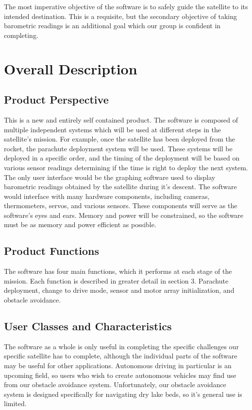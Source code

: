 \documentclass{scrreprt}
\begin{document}
The most imperative objective of the software is to safely guide the satellite to its intended destination. This is a requisite, but the secondary objective of taking barometric readings is an additional goal which our group is confident in completing.

\chapter{Overall Description}

\section{Product Perspective}
This is a new and entirely self contained product. The software is composed of multiple independent systems which will be used at different steps in the satellite's mission. For example, once the satellite has been deployed from the rocket, the parachute deployment system will be used. These systems will be deployed in a specific order, and the timing of the deployment will be based on various sensor readings determining if the time is right to deploy the next system. The only user interface would be the graphing software used to display barometric readings obtained by the satellite during it's descent. The software would interface with many hardware components, including cameras, thermometers, servos, and various sensors. These components will serve as the software's eyes and ears. Memory and power will be constrained, so the software must be as memory and power efficient as possible.

\section{Product Functions}
The software has four main functions, which it performs at each stage of the mission. Each function is described in greater detail in section 3. Parachute deployment, change to drive mode, sensor and motor array initialization, and obstacle avoidance. 

\section{User Classes and Characteristics}
The software as a whole is only useful in completing the specific challenges our specific satellite has to complete, although the individual parts of the software may be useful for other applications. Autonomous driving in particular is an upcoming field, so users who wish to create autonomous vehicles may find use from our obstacle avoidance system. Unfortunately, our obstacle avoidance system is designed specifically for navigating dry lake beds, so it's general use is limited. 
\end{document}
